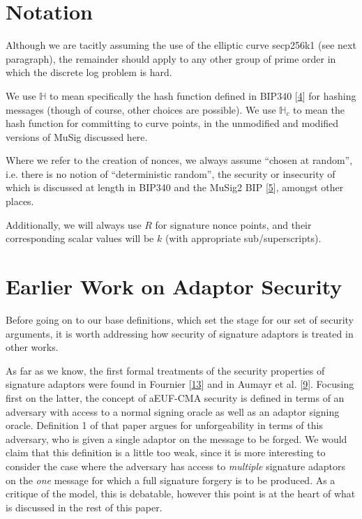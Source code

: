 \documentclass[10pt,a4paper]{article}
\begin{document}
\section{Notation}

Although we are tacitly assuming the use of the elliptic curve secp256k1 (see next paragraph), the remainder should apply to any other group of prime order in which the discrete log problem is hard.

We use $\mathbb{H}$ to mean specifically the hash function defined in BIP340 {[}\protect\hyperlink{anchor-4}{4}{]} for hashing messages (though of course, other choices are possible). We use $\mathbb{H}_c$ to mean the hash function for committing to curve points, in the unmodified and modified versions of MuSig discussed here.

Where we refer to the creation of nonces, we always assume ``chosen at random'', i.e. there is no notion of ``deterministic random'', the security or insecurity of which is discussed at length in BIP340 and the MuSig2 BIP {[}\protect\hyperlink{anchor-5}{5}{]}, amongst other places.

Additionally, we will always use $R$ for signature nonce points, and their corresponding scalar values will be $k$ (with appropriate sub/superscripts).

\section{Earlier Work on Adaptor Security}

Before going on to our base definitions, which set the stage for our set of security arguments, it is worth addressing how security of signature adaptors is treated in other works.

\vspace{5 pt}

As far as we know, the first formal treatments of the security properties of signature adaptors were found in Fournier {[}\protect\hyperlink{anchor-13}{13}{]} and in Aumayr et al. {[}\protect\hyperlink{anchor-9}{9}{]}. Focusing first on the latter, the concept of aEUF-CMA security is defined in terms of an adversary with access to a normal signing oracle as well as an adaptor signing oracle. Definition 1 of that paper argues for unforgeability in terms of this adversary, who is given a single adaptor on the message to be forged. We would claim that this definition is a little too weak, since it is more interesting to consider the case where the adversary has access to \emph{multiple} signature adaptors on the \emph{one} message for which a full signature forgery is to be produced. As a critique of the model, this is debatable, however this point is at the heart of what is discussed in the rest of this paper. 
\end{document}
